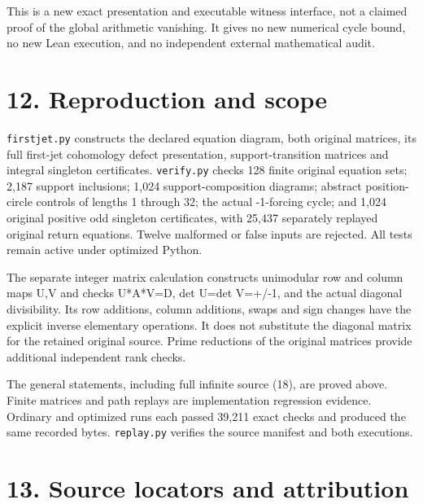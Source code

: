 This is a new exact presentation and executable witness interface, not a
claimed proof of the global arithmetic vanishing. It gives no new
numerical cycle bound, no new Lean execution, and no independent
external mathematical audit.

\section{12. Reproduction and scope}

\nolinkurl{firstjet.py} constructs the declared equation diagram, both
original matrices, its full first-jet cohomology defect presentation,
support-transition matrices and integral singleton certificates.
\nolinkurl{verify.py} checks 128 finite original equation sets; 2,187
support inclusions; 1,024 support-composition diagrams; abstract
position-circle controls of lengths 1 through 32; the actual -1-forcing
cycle; and 1,024 original positive odd singleton certificates, with
25,437 separately replayed original return equations. Twelve malformed
or false inputs are rejected. All tests remain active under optimized
Python.

The separate integer matrix calculation constructs unimodular row and
column maps U,V and checks U*A*V=D, det U=det V=+/-1, and the actual
diagonal divisibility. Its row additions, column additions, swaps and
sign changes have the explicit inverse elementary operations. It does
not substitute the diagonal matrix for the retained original source.
Prime reductions of the original matrices provide additional independent
rank checks.

The general statements, including full infinite source (18), are proved
above. Finite matrices and path replays are implementation regression
evidence. Ordinary and optimized runs each passed 39,211 exact checks
and produced the same recorded bytes. \nolinkurl{replay.py} verifies the
source manifest and both executions.

\section{13. Source locators and attribution}

